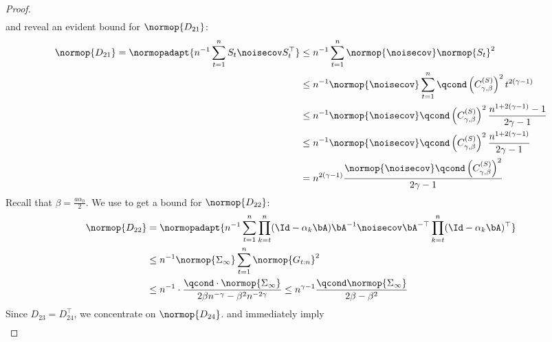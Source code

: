 \begin{proof}
\begin{align}
    \end{align}
    {} and {}  reveal an evident bound for $\normop{D_{21}}$:
    \begin{align}
        \label{lemma:D21_bound}
        \normop{D_{21}} = \normopadapt{n^{-1} \sum_{t=1}^n S_t \noisecov S_t^\top} &\leq n^{-1} \sum_{t=1}^n \normop{\noisecov} \normop{S_t}^2 \\  &\leq n^{-1} \normop{\noisecov} \sum_{t=1}^n \qcond \left(C_{\gamma, \beta}^{(S)}\right)^2 t^{2(\gamma-1)} \\ &\leq
        n^{-1} \normop{\noisecov} \qcond \left(C_{\gamma, \beta}^{(S)}\right)^2 \frac{n^{1+2(\gamma - 1)} - 1}{2\gamma - 1} \\ &\leq n^{-1} \normop{\noisecov} \qcond \left(C_{\gamma, \beta}^{(S)}\right)^2 \frac{n^{1+2(\gamma - 1)}}{2\gamma - 1} \\ &= n^{2(\gamma - 1)} \frac{\normop{\noisecov} \qcond \left(C_{\gamma, \beta}^{(S)}\right)^2}{2\gamma - 1} 
    \end{align}
    Recall that $\beta = \frac{a \alpha_0}{2}$. We use {} to get a bound for $\normop{D_{22}}$:
    \begin{align} 
        \label{lemma:D22_bound}
        \normop{D_{22}} &= \normopadapt{n^{-1}\sum_{t=1}^n \prod_{k=t}^n (\Id - \alpha_k \bA) \bA^{-1} \noisecov \bA^{-\top} \prod_{k=t}^n (\Id - \alpha_k \bA)^\top} \\ &\leq n^{-1} \normop{\Sigma_\infty} \sum_{t=1}^n \normop{G_{t:n}}^2 \\ &\leq n^{-1} \cdot \frac{\qcond\cdot \normop{\Sigma_{\infty}}}{2\beta n^{-\gamma} - \beta^2 n^{-2\gamma}} \leq n^{\gamma - 1} \frac{\qcond \normop{\Sigma_\infty}}{2\beta - \beta^2}
    \end{align}
    Since $D_{23} = D_{24}^\top$, we concentrate on $\normop{D_{24}}$. {} and {} immediately imply 
    \begin{align}

\end{align}
\end{proof}
